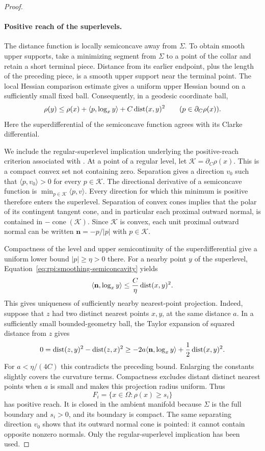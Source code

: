 \begin{proof}
\paragraph{Positive reach of the superlevels.}
The distance function is locally semiconcave away from $\Sigma$.
To obtain smooth upper supports, take a minimizing segment from
$\Sigma$ to a point of the collar and retain a short terminal piece.
Distance from its earlier endpoint, plus the length of the preceding
piece, is a smooth upper support near the terminal point. The local
Hessian comparison estimate gives a uniform upper Hessian bound on
a sufficiently small fixed ball. Consequently, in a geodesic
coordinate ball,
\begin{equation}\label{eq:rpi:smoothing-semiconcavity}
 \rho(y)\le\rho(x)+\langle p,\log_x y\rangle
                  +C\operatorname{dist}(x,y)^2
 \qquad(p\in\partial_C\rho(x)).
\end{equation}
Here the superdifferential of the semiconcave function agrees with its
Clarke differential.

We include the regular-superlevel implication underlying the
positive-reach criterion associated with \cite{Bangert1982}.
At a point of a regular level, let
$\mathcal K=\partial_C\rho(x)$. This is a compact convex set not
containing zero. Separation gives a direction $v_0$ such that
$\langle p,v_0\rangle>0$ for every $p\in\mathcal K$. The directional
derivative of a semiconcave function is
$\min_{p\in\mathcal K}\langle p,v\rangle$. Every direction for which
this minimum is positive therefore enters the superlevel. Separation
of convex cones implies that the polar of its contingent tangent
cone, and in particular each proximal outward normal, is contained
in $-\operatorname{cone}(\mathcal K)$. Since $\mathcal K$ is convex,
each unit proximal outward normal can be written
$\mathbf n=-p/|p|$ with $p\in\mathcal K$.

Compactness of the level and upper semicontinuity of the
superdifferential give a uniform lower bound $|p|\ge\eta>0$ there.
For a nearby point $y$ of the superlevel,
Equation~\eqref{eq:rpi:smoothing-semiconcavity} yields
\[
 \langle\mathbf n,\log_x y\rangle
       \le\frac C\eta\operatorname{dist}(x,y)^2.
\]
This gives uniqueness of sufficiently nearby nearest-point
projection. Indeed, suppose that $z$ had two distinct nearest
points $x,y$, at the same distance $a$. In a sufficiently small
bounded-geometry ball, the Taylor expansion of squared distance
from $z$ gives
\[
 0=\operatorname{dist}(z,y)^2-\operatorname{dist}(z,x)^2
 \ge-2a\langle\mathbf n,\log_x y\rangle
                         +\frac12\operatorname{dist}(x,y)^2.
\]
For $a<\eta/(4C)$ this contradicts the preceding bound. Enlarging
the constants slightly covers the curvature terms. Compactness
excludes distant distinct nearest points when $a$ is small and
makes this projection radius uniform. Thus
\[
 F_i=\{x\in\Omega:\rho(x)\ge s_i\}
\]
has positive reach. It is closed in the ambient manifold because
$\Sigma$ is the full boundary and $s_i>0$, and its boundary is
compact. The same separating direction $v_0$ shows that its outward
normal cone is pointed: it cannot contain opposite nonzero normals.
Only the regular-superlevel implication has been used.


\end{proof}
